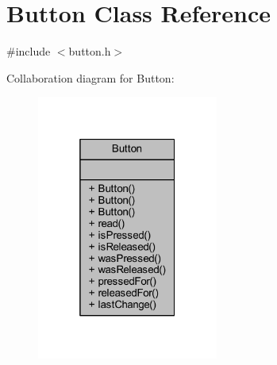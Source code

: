 \hypertarget{class_button}{}\section{Button Class Reference}
\label{class_button}


{\ttfamily \#include $<$button.\+h$>$}



Collaboration diagram for Button\+:\nopagebreak
\begin{figure}[H]
\begin{center}
\leavevmode
\includegraphics[width=169pt]{class_button__coll__graph}
\end{center}
\end{figure}

